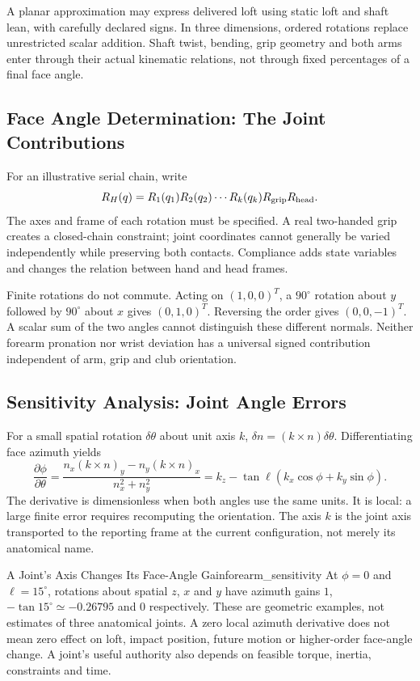 A planar approximation may express delivered loft using static loft and
shaft lean, with carefully declared signs. In three dimensions, ordered
rotations replace unrestricted scalar addition. Shaft twist, bending, grip
geometry and both arms enter through their actual kinematic relations, not
through fixed percentages of a final face angle.

\subsection{Face Angle Determination: The Joint Contributions}

For an illustrative serial chain, write
\[
R_H(q)=R_1(q_1)R_2(q_2)\cdots R_k(q_k)R_{\rm grip}R_{\rm head}.
\]
The axes and frame of each rotation must be specified. A real two-handed
grip creates a closed-chain constraint; joint coordinates cannot generally
be varied independently while preserving both contacts. Compliance adds
state variables and changes the relation between hand and head frames.

Finite rotations do not commute. Acting on $(1,0,0)^T$, a $90^\circ$ rotation
about $y$ followed by $90^\circ$ about $x$ gives $(0,1,0)^T$. Reversing the
order gives $(0,0,-1)^T$. A scalar sum of the two angles cannot distinguish
these different normals. Neither forearm pronation nor wrist deviation has
a universal signed contribution independent of arm, grip and club orientation.

\subsection{Sensitivity Analysis: Joint Angle Errors}

For a small spatial rotation $\delta\theta$ about unit axis $k$,
$\delta n=(k\times n)\delta\theta$. Differentiating face azimuth yields
\[
\frac{\partial\phi}{\partial\theta}
=\frac{n_x(k\times n)_y-n_y(k\times n)_x}{n_x^2+n_y^2}
=k_z-\tan\ell(k_x\cos\phi+k_y\sin\phi).
\]
The derivative is dimensionless when both angles use the same units. It is
local: a large finite error requires recomputing the orientation. The axis
$k$ is the joint axis transported to the reporting frame at the current
configuration, not merely its anatomical name.

\begin{example}{A Joint's Axis Changes Its Face-Angle Gain}{forearm_sensitivity}
At $\phi=0$ and $\ell=15^\circ$, rotations about spatial $z$, $x$ and $y$
have azimuth gains $1$, $-\tan15^\circ\simeq-0.26795$ and $0$ respectively.
These are geometric examples, not estimates of three anatomical joints.
A zero local azimuth derivative does not mean zero effect on loft, impact
position, future motion or higher-order face-angle change. A joint's useful
authority also depends on feasible torque, inertia, constraints and time.
\end{example}

